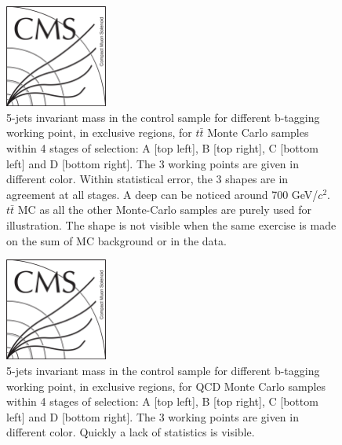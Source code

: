 \begin{figure}[!Hhtbp]
  \begin{center}
    \includegraphics[width=0.3\textwidth]{figs/CMSlogo.png}
    \caption{5-jets invariant mass in the control sample for different b-tagging working point, in exclusive regions, for $t\bar{t}$ Monte Carlo samples within 4 stages of selection: A [top left], B [top right], C [bottom left] and D [bottom right]. The 3 working points are given in different color. Within statistical error, the 3 shapes are in agreement at all stages. A deep can be noticed around 700 GeV/$c^{2}$. $t\bar{t}$ MC as all the other Monte-Carlo samples are purely used for illustration. The shape is not visible when the same exercise is made on the sum of MC background or in the data.}
    \label{fig:StageExWPttbar}
  \end{center}
\end{figure}\clearpage

\begin{figure}[!Hhtbp]
  \begin{center}
    \includegraphics[width=0.3\textwidth]{figs/CMSlogo.png}
    \caption{5-jets invariant mass in the control sample for different b-tagging working point, in exclusive regions, for QCD Monte Carlo samples within 4 stages of selection: A [top left], B [top right], C [bottom left] and D [bottom right]. The 3 working points are given in different color. Quickly a lack of statistics is visible.}
    \label{fig:StageExWPQCD}
  \end{center}
\end{figure}\clearpage

